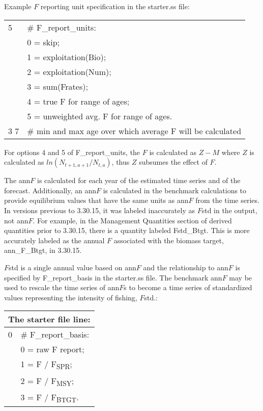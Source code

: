 Example $F$ reporting unit specification in the starter.ss file:

\begin{center}
	\begin{longtable}{p{2cm} p{12cm}}
		\hline
		5 & \# F\_report\_units:\Tstrut\\
		  & 0 = skip; \\
		  & 1 = exploitation(Bio); \\
		  & 2 = exploitation(Num); \\ 
		  & 3 = sum(Frates); \\
		  & 4 = true F for range of ages; \\
		  & 5 = unweighted avg. F for range of ages. \Bstrut\\
		\hline
		3 7 & \# min and max age over which average F will be calculated \Tstrut\Bstrut\\
		\hline
	\end{longtable}
\end{center}

For options 4 and 5 of F\_report\_units, the $F$ is calculated as $Z-M$ where $Z$ is calculated as $ln(N_{t+1,a+1}/N_{t,a})$, thus $Z$ subsumes the effect of $F$.

The ann$F$ is calculated for each year of the estimated time series and of the forecast. Additionally, an ann$F$ is calculated in the benchmark calculations to provide equilibrium values that have the same units as ann$F$ from the time series.  In versions previous to 3.30.15, it was labeled inaccurately as $F$std in the output, not ann$F$. For example, in the Management Quantities section of derived quantities prior to 3.30.15, there is a quantity labeled Fstd\_Btgt. This is more accurately labeled as the annual $F$ associated with the biomass target, ann\_F\_Btgt, in 3.30.15.

$F$std is a single annual value based on ann$F$ and the relationship to ann$F$ is specified by F\_report\_basis in the starter.ss file. The benchmark ann$F$ may be used to rescale the time series of ann$F$s to become a time series of standardized values representing the intensity of fishing, $F$std.:

\begin{center}
	\begin{longtable}{p{2cm} p{12cm}}
		\multicolumn{2}{l}{The starter file line:}\\
		\hline
		0 & \# F\_report\_basis: \Tstrut\\
		& 0 = raw F report; \\
		& 1 = F / F\textsubscript{SPR}; \\ 
		& 2 = F / F\textsubscript{MSY}; \\
		& 3 = F / F\textsubscript{BTGT}.\\
		\hline
	\end{longtable}
\end{center}

